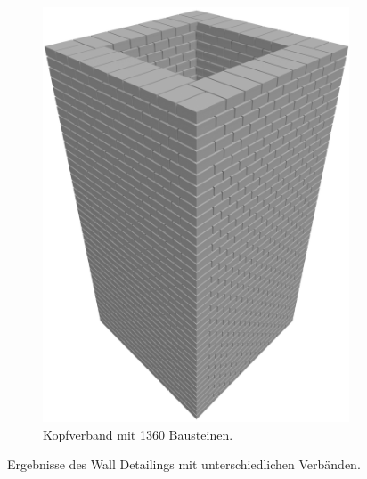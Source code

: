 \begin{figure}[htb]
\begin{subfigure}[b]{0.27\columnwidth}
      \includegraphics[width=\columnwidth]{fig/scenario1_render_headbond.png}
      \caption{Kopfverband mit 1360 Bausteinen.}\label{fig:poc:render_headbond}
    \end{subfigure}
    \hspace*{\fill}%
    \caption{Ergebnisse des Wall Detailings mit unterschiedlichen Verbänden.}\label{fig:poc:result_scenario1}
\end{figure}


